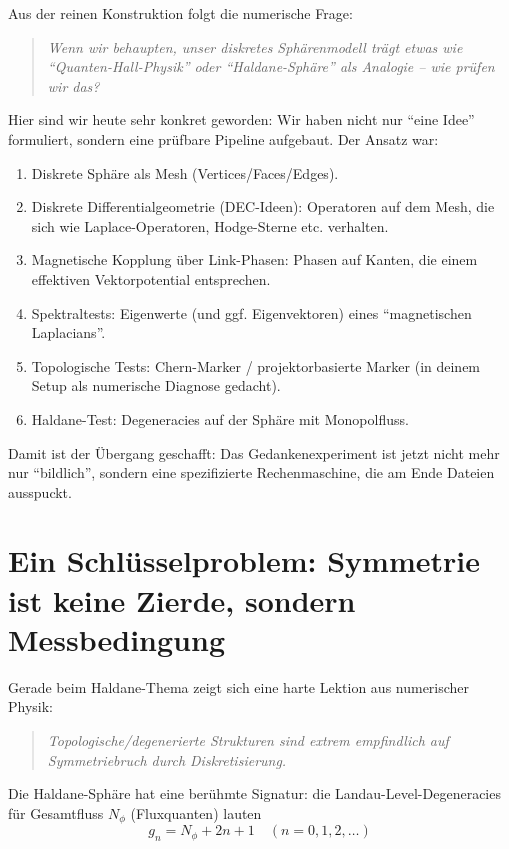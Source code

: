 \documentclass[11pt,a4paper]{article}
\begin{document}
Aus der reinen Konstruktion folgt die numerische Frage:

\begin{quote}
\emph{Wenn wir behaupten, unser diskretes Sphärenmodell trägt etwas wie ``Quanten-Hall-Physik'' oder ``Haldane-Sphäre'' als Analogie -- wie prüfen wir das?}
\end{quote}

Hier sind wir heute sehr konkret geworden: Wir haben nicht nur ``eine Idee'' formuliert, sondern eine prüfbare Pipeline aufgebaut. Der Ansatz war:
\begin{enumerate}[leftmargin=*,itemsep=0.5em]
    \item Diskrete Sphäre als Mesh (Vertices/Faces/Edges).
    \item Diskrete Differentialgeometrie (DEC-Ideen): Operatoren auf dem Mesh, die sich wie Laplace-Operatoren, Hodge-Sterne etc. verhalten.
    \item Magnetische Kopplung über Link-Phasen: Phasen auf Kanten, die einem effektiven Vektorpotential entsprechen.
    \item Spektraltests: Eigenwerte (und ggf. Eigenvektoren) eines ``magnetischen Laplacians''.
    \item Topologische Tests: Chern-Marker / projektorbasierte Marker (in deinem Setup als numerische Diagnose gedacht).
    \item Haldane-Test: Degeneracies auf der Sphäre mit Monopolfluss.
\end{enumerate}

Damit ist der Übergang geschafft: Das Gedankenexperiment ist jetzt nicht mehr nur ``bildlich'', sondern eine spezifizierte Rechenmaschine, die am Ende Dateien ausspuckt.

\section{Ein Schlüsselproblem: Symmetrie ist keine Zierde, sondern Messbedingung}

Gerade beim Haldane-Thema zeigt sich eine harte Lektion aus numerischer Physik:

\begin{quote}
\emph{Topologische/degenerierte Strukturen sind extrem empfindlich auf Symmetriebruch durch Diskretisierung.}
\end{quote}

Die Haldane-Sphäre hat eine berühmte Signatur: die Landau-Level-Degeneracies für Gesamtfluss $N_\phi$ (Fluxquanten) lauten
\[
g_n = N_\phi + 2n + 1 \quad (n=0,1,2,\dots)
\]
\end{document}
